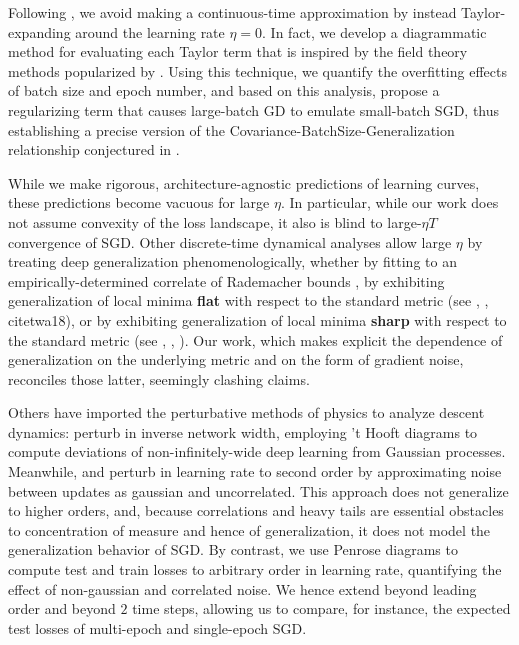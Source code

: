 \documentclass{article}
\begin{document}
    Following \citet{ro18}, we avoid making a continuous-time approximation by
    instead Taylor-expanding around the learning rate $\eta=0$.  In fact, we
    develop a diagrammatic method for evaluating each Taylor term that is
    inspired by the field theory methods popularized by \citet{dy49a}.  Using
    this technique, we quantify the overfitting effects of batch size and epoch
    number, and based on this analysis, propose a regularizing term that causes
    large-batch GD to emulate small-batch SGD, thus establishing a precise
    version of the Covariance-BatchSize-Generalization relationship conjectured
    in \citet{ja18}.  
    
    While we make rigorous, architecture-agnostic predictions of learning
    curves, these predictions become vacuous for large $\eta$.  In particular,
    while our work does not assume convexity of the loss landscape, it also is
    blind to large-$\eta T$ convergence of SGD.  Other discrete-time dynamical
    analyses allow large $\eta$ by treating deep generalization
    phenomenologically, whether by fitting to an empirically-determined
    correlate of Rademacher bounds \citep{li18}, by exhibiting generalization
    of local minima {\bf flat} with respect to the standard metric (see
    \citet{ho17}, \citet{ke17}, citet{wa18}), or by exhibiting generalization
    of local minima {\bf sharp} with respect to the standard metric (see
    \citet{st56}, \citet{di17}, \citet{wu18}).  Our work, which makes explicit
    the dependence of generalization on the underlying metric and on the form
    of gradient noise, reconciles those latter, seemingly clashing claims.
    
    Others have imported the perturbative methods of physics to analyze descent
    dynamics:  \citet{dy19} perturb in inverse network width, employing 't
    Hooft diagrams to compute deviations of non-infinitely-wide deep learning
    from Gaussian processes.  Meanwhile, \cite{ch18} and \citet{li17} perturb
    in learning rate to second order by approximating noise between updates as
    gaussian and uncorrelated.  This approach does not generalize to higher
    orders, and, because correlations and heavy tails are essential obstacles
    to concentration of measure and hence of generalization, it does not model
    the generalization behavior of SGD.  By contrast, we use Penrose diagrams
    to compute test and train losses to arbitrary order in learning rate,
    quantifying the effect of non-gaussian and correlated noise.  We hence
    extend \citet{ro18} beyond leading order and beyond $2$ time steps,
    allowing us to compare, for instance, the expected test losses of
    multi-epoch and single-epoch SGD.
\end{document}
